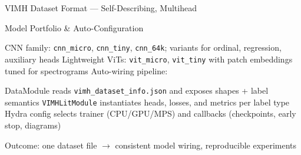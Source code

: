 \begin{slide}[\slideopts,toc={VIMH}]{VIMH Dataset Format — Self-Describing, Multihead}
\begin{center}
  \end{center}
\end{slide}

\begin{slide}[\slideopts,toc={Models}]{Model Portfolio & Auto-Configuration}
  \vspace{-0.75em}
  \begin{itemize}
    \mpitem CNN family: \texttt{cnn\_micro}, \texttt{cnn\_tiny}, \texttt{cnn\_64k}; variants for ordinal, regression, auxiliary heads
    \mpitem Lightweight ViTs: \texttt{vit\_micro}, \texttt{vit\_tiny} with patch embeddings tuned for spectrograms
    \mpitem Auto-wiring pipeline:
    \begin{itemize}
      \mpitem DataModule reads \texttt{vimh\_dataset\_info.json} and exposes shapes + label semantics
      \mpitem \texttt{VIMHLitModule} instantiates heads, losses, and metrics per label type
      \mpitem Hydra config selects trainer (CPU/GPU/MPS) and callbacks (checkpoints, early stop, diagrams)
    \end{itemize}
    \mpitem Outcome: one dataset file $\to$ consistent model wiring, reproducible experiments
  \end{itemize}
\end{slide}

